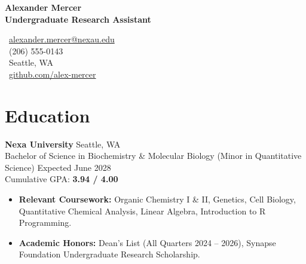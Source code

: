 \documentclass[10pt,letterpaper]{article}
\begin{document}
\color{textdark}

\noindent
\begin{minipage}[t]{0.65\textwidth}
    {\Huge\bfseries\color{primary} Alexander Mercer} \\
    \vspace{4pt}
    {\large\bfseries\color{textmuted} Undergraduate Research Assistant}
\end{minipage}%
\begin{minipage}[t]{0.35\textwidth}
    \raggedleft
    \small
    \faEnvelope\ \href{mailto:alexander.mercer@nexau.edu}{alexander.mercer@nexau.edu} \\
    \vspace{2pt}
    \faPhone\ (206) 555-0143 \\
    \vspace{2pt}
    \faMapMarker\ Seattle, WA \\
    \vspace{2pt}
    \faGithub\ \href{https://github.com/alex-mercer}{github.com/alex-mercer}
\end{minipage}

\vspace{10pt}

\section*{Education}
\noindent
\textbf{Nexa University} \hfill Seattle, WA \\
Bachelor of Science in Biochemistry \& Molecular Biology (Minor in Quantitative Science) \hfill Expected June 2028 \\
Cumulative GPA: \textbf{3.94 / 4.00}
\begin{itemize}
    \item \textbf{Relevant Coursework:} Organic Chemistry I \& II, Genetics, Cell Biology, Quantitative Chemical Analysis, Linear Algebra, Introduction to R Programming.
    \item \textbf{Academic Honors:} Dean's List (All Quarters 2024 -- 2026), Synapse Foundation Undergraduate Research Scholarship.
\end{itemize}

\end{document}
